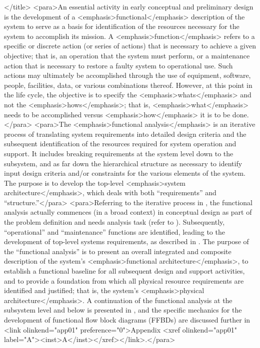 </title>
<para>An essential activity in early conceptual and preliminary design is the development of a <emphasis>functional</emphasis> description of the system to serve as a basis for identification of the resources necessary for the system to accomplish its mission. A <emphasis>function</emphasis> refers to a specific or discrete action (or series of actions) that is necessary to achieve a given objective; that is, an operation that the system must perform, or a maintenance action that is necessary to restore a faulty system to operational use. Such actions may ultimately be accomplished through the use of equipment, software, people, facilities, data, or various combinations thereof. However, at this point in the life cycle, the objective is to specify the <emphasis>whats</emphasis> and not the <emphasis>hows</emphasis>; that is, <emphasis>what</emphasis> needs to be accomplished versus <emphasis>how</emphasis> it is to be done.</para>
<para>The <emphasis>functional analysis</emphasis> is an iterative process of translating system requirements into detailed design criteria and the subsequent identification of the resources required for system operation and support. It includes breaking requirements at the system level down to the subsystem, and as far down the hierarchical structure as necessary to identify input design criteria and/or constraints for the various elements of the system. The purpose is to develop the top-level <emphasis>system architecture</emphasis>, which deals with both “requirements” and “structure.”</para>
<para>Referring to the iterative process in , the functional analysis actually commences (in a broad context) in conceptual design as part of the problem definition and needs analysis task (refer to ). Subsequently, “operational” and “maintenance” functions are identified, leading to the development of top-level systems requirements, as described in . The purpose of the “functional analysis” is to present an overall integrated and composite description of the system’s <emphasis>functional architecture</emphasis>, to establish a functional baseline for all subsequent design and support activities, and to provide a foundation from which all physical resource requirements are identified and justified; that is, the system’s <emphasis>physical architecture</emphasis>. A continuation of the functional analysis at the subsystem level and below is presented in , and the specific mechanics for the development of functional flow block diagrams (FFBDs) are discussed further in <link olinkend="app01" preference="0">Appendix <xref olinkend="app01" label="A"><inst>A</inst></xref></link>.</para>

